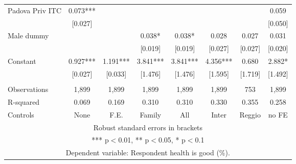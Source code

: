 \begin{tabular}{lccccccc}
Padova Priv ITC & 0.073*** &  &  &  &  &  & 0.059 \\
 & [0.027] &  &  &  &  &  & [0.050] \\
Male dummy &  &  & 0.038* & 0.038* & 0.028 & 0.027 & 0.031 \\
 &  &  & [0.019] & [0.019] & [0.027] & [0.027] & [0.020] \\
Constant & 0.927*** & 1.191*** & 3.841*** & 3.841*** & 4.356*** & 0.680 & 2.882* \\
 & [0.027] & [0.033] & [1.476] & [1.476] & [1.595] & [1.719] & [1.492] \\
 &  &  &  &  &  &  &  \\
Observations & 1,899 & 1,899 & 1,899 & 1,899 & 1,899 & 753 & 1,899 \\
R-squared & 0.069 & 0.169 & 0.310 & 0.310 & 0.330 & 0.355 & 0.258 \\
 Controls & None & F.E. & Family & All & Inter & Reggio & no FE \\ \hline
\multicolumn{8}{c}{ Robust standard errors in brackets} \\
\multicolumn{8}{c}{ *** p$<$0.01, ** p$<$0.05, * p$<$0.1} \\
\multicolumn{8}{c}{ Dependent variable: Respondent health is good (\%).} \\
\end{tabular}
